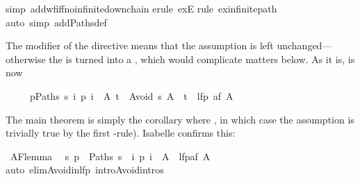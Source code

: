 \begin{isabellebody}
simp\ add{\isacharcolon}wf{\isacharunderscore}iff{\isacharunderscore}no{\isacharunderscore}infinite{\isacharunderscore}down{\isacharunderscore}chain{\isacharparenright}\isanewline
{}erule\ exE{\isacharparenright}\isanewline
{}rule\ ex{\isacharunderscore}infinite{\isacharunderscore}path{\isacharparenright}\isanewline
{}auto\ simp\ add{\isacharcolon}Paths{\isacharunderscore}def{\isacharparenright}\isanewline
{}%
\begin{isamarkuptext}%
The  modifier of the  directive means
that the assumption is left unchanged---otherwise the  is turned
into a , which would complicate matters below. As it is,
 is now
\begin{isabelle}%
\ \ \ \ \ {\isasymlbrakk}{\isasymforall}p{\isasymin}Paths\ s{\isachardot}\ {\isasymexists}i{\isachardot}\ p\ i\ {\isasymin}\ A{\isacharsemicolon}\ t\ {\isasymin}\ Avoid\ s\ A{\isasymrbrakk}\ {\isasymLongrightarrow}\ t\ {\isasymin}\ lfp\ {\isacharparenleft}af\ A{\isacharparenright}%
\end{isabelle}
The main theorem is simply the corollary where ,
in which case the assumption  is trivially true
by the first -rule). Isabelle confirms this:%
\end{isamarkuptext}%
\ AF{\isacharunderscore}lemma{}{\isacharcolon}\isanewline
\ \ {\isachardoublequote}{\isacharbraceleft}s{\isachardot}\ {\isasymforall}p\ {\isasymin}\ Paths\ s{\isachardot}\ {\isasymexists}\ i{\isachardot}\ p\ i\ {\isasymin}\ A{\isacharbraceright}\ {\isasymsubseteq}\ lfp{\isacharparenleft}af\ A{\isacharparenright}{\isachardoublequote}\isanewline
{}auto\ elim{\isacharcolon}Avoid{\isacharunderscore}in{\isacharunderscore}lfp\ intro{\isacharcolon}Avoid{\isachardot}intros{\isacharparenright}\isanewline
\isanewline
\end{isabellebody}%
